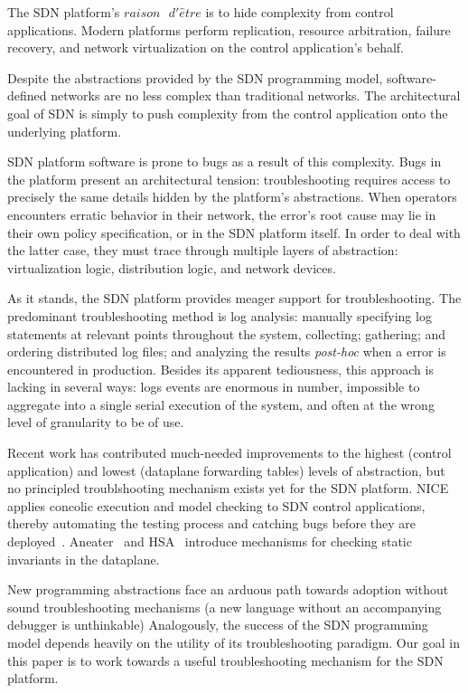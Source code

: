 The SDN platform's $raison\text{ }d'\hat{e}tre$ is to 
hide complexity from control applications. Modern platforms perform
replication, resource arbitration, failure recovery, and network 
virtualization on the control application's behalf. 

Despite the abstractions provided by the SDN programming model,
software-defined networks are no less complex than traditional networks. The architectural goal of SDN is
simply to push complexity from the control application onto the underlying platform.

SDN platform software is prone to bugs as a result of this complexity. Bugs in the
platform present an architectural tension: troubleshooting requires
access to precisely the same details hidden by the platform's abstractions.
When operators encounters erratic behavior in their network, the error's root
cause may lie in their own policy specification, or in the SDN platform
itself. In order to deal with the latter case, they must trace through
multiple layers of abstraction: virtualization logic, distribution logic, and
network devices.

As it stands, the SDN platform provides meager support for troubleshooting.
The predominant troubleshooting method is log analysis: manually
specifying log statements at relevant points throughout the system,
collecting; gathering; and ordering distributed log files; and analyzing the
results {\it post-hoc} when a error is encountered in production. Besides its
apparent tediousness, this approach is lacking in several ways: logs events
are enormous in number, impossible to aggregate into a single serial
execution of the system, and often at the wrong level of granularity to be of
use. 

Recent work has contributed much-needed improvements to the highest (control
application) and lowest (dataplane forwarding tables) levels of abstraction, 
but no principled troublshooting mechanism exists yet for the SDN platform.
NICE applies concolic execution and model checking to SDN control
applications, thereby automating the testing process and catching bugs before
they are deployed~\cite{nice}. Aneater~\cite{anteater} and HSA~\cite{hsa}
introduce mechanisms for checking static invariants in the dataplane.

New programming abstractions face an arduous path towards adoption
without sound troubleshooting mechanisms (\eg a new language
without an accompanying debugger is unthinkable) Analogously, the success of the
SDN programming model depends heavily on the utility of its troubleshooting
paradigm. Our goal in this paper is to work towards a useful
troubleshooting mechanism for the SDN platform. 

